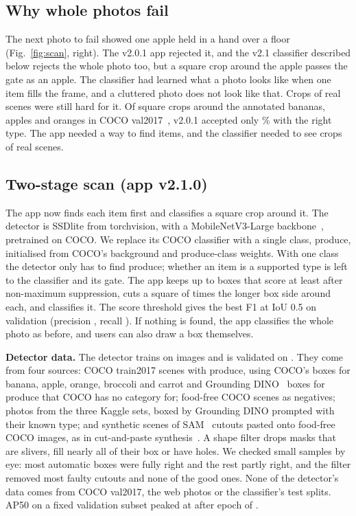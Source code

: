 \subsection{Why whole photos fail}
The next photo to fail showed one apple held in a hand over a floor
(Fig.~\ref{fig:scan}, right). The v2.0.1 app rejected it, and the v2.1
classifier described below rejects the whole photo too, but a square crop
around the apple passes the gate as an apple. The classifier had learned what a
photo looks like when one item fills the frame, and a cluttered photo does not
look like that. Crops of real scenes were still hard for it. Of \CocoCropsN{}
square crops around the annotated bananas, apples and oranges in COCO
val2017~\cite{lin2014coco}, v2.0.1 accepted only \VoneCocoCrops\% with the
right type. The app needed a way to find items, and the classifier needed to
see crops of real scenes.

\subsection{Two-stage scan (app v2.1.0)}
The app now finds each item first and classifies a square crop around it. The
detector is SSDlite from torchvision, with a MobileNetV3-Large
backbone~\cite{liu2016ssd,howard2019mobilenetv3}, pretrained on COCO. We replace
its COCO classifier with a single class, produce, initialised from COCO's
background and produce-class weights. With one class the detector only has to
find produce; whether an item is a supported type is left to the classifier and
its gate. The app keeps up to \DetMaxItems{} boxes that score at least
\DetScore{} after non-maximum suppression, cuts a square of \DetCropScale{}
times the longer box side around each, and classifies it. The score threshold
gives the best F1 at IoU 0.5 on validation (precision \DetValP, recall
\DetValR). If nothing is found, the app classifies the whole photo as before,
and users can also draw a box themselves.

\textbf{Detector data.} The detector trains on \DetNTrain{} images and is
validated on \DetNVal{}. They come from four sources: COCO train2017 scenes
with produce, using COCO's boxes for banana, apple, orange, broccoli and carrot
and Grounding DINO~\cite{liu2024groundingdino} boxes for produce that COCO has
no category for; food-free COCO scenes as negatives; photos from the three
Kaggle sets, boxed by Grounding DINO prompted with their known type; and
\DetNSynth{} synthetic scenes of SAM~\cite{kirillov2023sam} cutouts pasted onto
food-free COCO images, as in cut-and-paste
synthesis~\cite{dwibedi2017cutpaste,ghiasi2021copypaste}. A shape filter drops
masks that are slivers, fill nearly all of their box or have holes. We checked
small samples by eye: most automatic boxes were fully right and the rest partly
right, and the filter removed most faulty cutouts and none of the good ones.
None of the detector's data comes from COCO val2017, the web photos or the
classifier's test splits. AP50 on a fixed validation subset peaked at \DetValApFifty{} after epoch
\DetBestEpoch{} of \DetEpochs.

